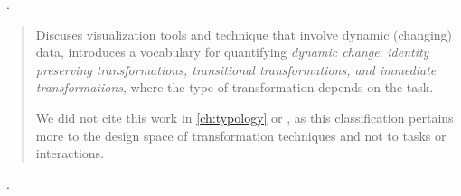 
\begin{sloppypar}
~\cite{Cottam2012}. \end{sloppypar}

\begin{quotation}
    Discuses visualization tools and technique that involve dynamic (\ie changing) data, introduces a vocabulary for quantifying {\it dynamic change}: {\it identity preserving transformations, transitional transformations, and immediate transformations}, where the type of transformation depends on the task.
    
    We did not cite this work in \autoref{ch:typology} or \citet{Brehmer2013}, as this classification pertains more to the design space of transformation techniques and not to tasks or interactions.
\end{quotation}

\begin{sloppypar}
~\cite{Crouser2012}. \end{sloppypar}


